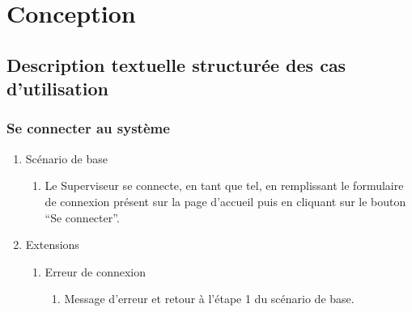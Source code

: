 
\chapter{Conception} %

\label{Chapter2} %



\section{Description textuelle structurée des cas d'utilisation}

\subsection{Se connecter au système}
\begin{enumerate}
\item Scénario de base 
\begin{enumerate}
\item Le Superviseur se connecte, en tant que tel, en remplissant le formulaire de connexion présent sur la page d’accueil puis en cliquant sur le bouton “Se connecter”.

\end{enumerate}
\item Extensions
\begin{enumerate}
\item Erreur de connexion

\begin{enumerate}
\item Message d’erreur et retour à l’étape 1 du scénario de base.
\end{enumerate}
\end{enumerate}
\end{enumerate}


